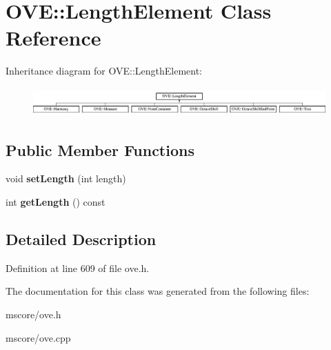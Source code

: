 \hypertarget{class_o_v_e_1_1_length_element}{}\section{O\+VE\+:\+:Length\+Element Class Reference}
\label{class_o_v_e_1_1_length_element}
Inheritance diagram for O\+VE\+:\+:Length\+Element\+:\begin{figure}[H]
\begin{center}
\leavevmode
\includegraphics[height=1.104536cm]{class_o_v_e_1_1_length_element}
\end{center}
\end{figure}
\subsection*{Public Member Functions}
\begin{DoxyCompactItemize}
\item 
\mbox{\label{class_o_v_e_1_1_length_element_ae0d16286bc38391a7baf50d4073cd216}} 
void {\bfseries set\+Length} (int length)
\item 
\mbox{\label{class_o_v_e_1_1_length_element_a414f40ab988dbc5a4cfcbf8732bbc3df}} 
int {\bfseries get\+Length} () const
\end{DoxyCompactItemize}


\subsection{Detailed Description}


Definition at line 609 of file ove.\+h.



The documentation for this class was generated from the following files\+:\begin{DoxyCompactItemize}
\item 
mscore/ove.\+h\item 
mscore/ove.\+cpp\end{DoxyCompactItemize}
